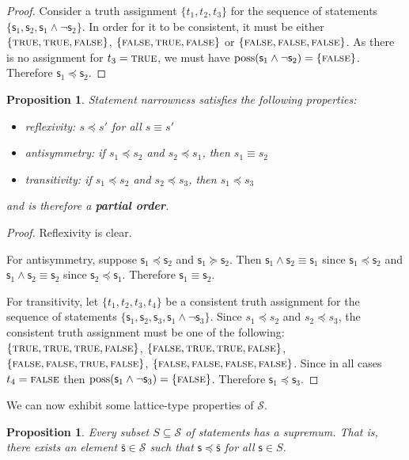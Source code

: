 \documentclass[psamsfonts]{amsart}
\newtheorem{prop}[thm]{Proposition}
\theoremstyle{definition}
\theoremstyle{remark}
\numberwithin{equation}{section}
\DeclareMathOperator{\possFn}{poss}
\def\TRUE{\textsc{true}}
\def\FALSE{\textsc{false}}
\def\stmtSet{\mathcal{S}}
\def\narrower{\preccurlyeq}
\def\broader{\succcurlyeq}
\def\AND{\wedge}
\def\NOT{\neg}
\newcommand{\stmt}[1][s] {\mathsf{#1}}
\begin{document}
\begin{proof}
	Consider a truth assignment $\{t_1, t_2, t_3\}$ for the sequence of statements $\{\stmt_1, \stmt_2, \stmt_1 \AND \NOT\stmt_2\}$. In order for it to be consistent, it must be either $\{\TRUE, \TRUE, \FALSE\}$, $\{\FALSE, \TRUE, \FALSE\}$ or $\{\FALSE, \FALSE, \FALSE\}$. As there is no assignment for $t_3=\TRUE$, we must have $\possFn(\stmt_1 \AND \NOT\stmt_2) = \{\FALSE\}$. Therefore $\stmt_1 \narrower \stmt_2$.
\end{proof}


\begin{prop}
	Statement narrowness satisfies the following properties:
	\begin{itemize}
		\item reflexivity: $s \narrower s'$ for all $s\equiv s'$
		\item antisymmetry: if $s_1 \narrower s_2$ and  $s_2 \narrower s_1$, then $s_1 \equiv s_2$
		\item transitivity: if $s_1 \narrower s_2$ and $s_2 \narrower s_3$, then $s_1 \narrower s_3$
	\end{itemize}
	and is therefore a \textbf{partial order}.
\end{prop}
\begin{proof}
Reflexivity is clear. 
	
	For antisymmetry, suppose $\stmt_1 \narrower \stmt_2$ and $\stmt_1 \broader \stmt_2$. Then $\stmt_1 \AND \stmt_2 \equiv \stmt_1$ since $\stmt_1 \narrower \stmt_2$ and $\stmt_1 \AND \stmt_2 \equiv \stmt_2$ since $\stmt_2 \narrower \stmt_1$. Therefore $\stmt_1 \equiv \stmt_2$. 
	
	For transitivity, let $\{t_1, t_2, t_3, t_4\}$ be a consistent truth assignment for the sequence of statements $\{\stmt_1, \stmt_2, \stmt_3, \stmt_1 \AND \NOT\stmt_3\}$.  Since $s_1 \narrower s_2$ and $s_2 \narrower s_3$, the consistent truth assignment must be one of the following: $\{\TRUE, \TRUE, \TRUE, \FALSE\}$, $\{\FALSE, \TRUE, \TRUE, \FALSE\}$, $\{\FALSE, \FALSE, \TRUE, \FALSE\}$, $\{\FALSE, \FALSE, \FALSE, \FALSE\}$.
	Since in all cases $t_4=\FALSE$ then $\possFn(\stmt_1 \AND \NOT\stmt_3) = \{\FALSE\}$. Therefore $\stmt_1 \narrower \stmt_3$.
\end{proof}

We can now exhibit some lattice-type properties of $\mathcal{S}$. 

\begin{prop}
	Every subset $S \subseteq \stmtSet$ of statements has a supremum. That is, there exists an element $\bar{\stmt} \in \stmtSet$ such that $\stmt \narrower \bar{\stmt}$ for all $\stmt \in S$. 
\end{prop}
\end{document}
